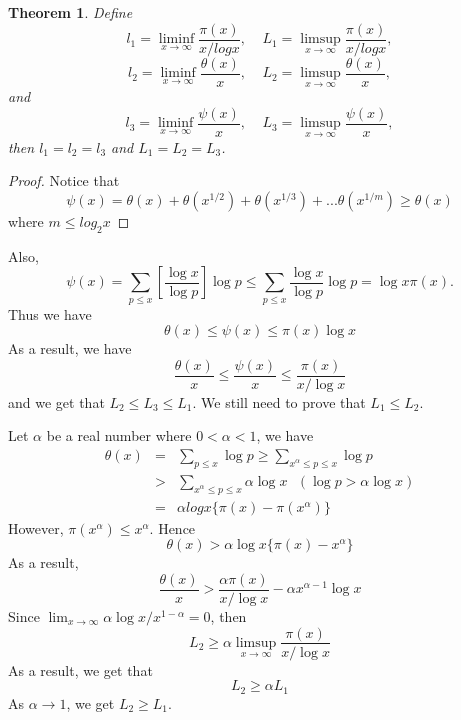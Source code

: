 \documentclass[12pt,letterpaper]{book}
\newtheorem{theorem}{Theorem}
\begin{document}
\begin{theorem}
Define
\begin{equation*}
l_1=\liminf_{x\rightarrow \infty}\frac{\pi(x)}{x/log x}, \ \ \ \ \
L_1=\limsup_{x\rightarrow \infty}\frac{\pi(x)}{x/log x},
\end{equation*}
\begin{equation*}
l_2=\liminf_{x\rightarrow \infty}\frac{\theta(x)}{x}, \ \ \ \ \
L_2=\limsup_{x\rightarrow \infty}\frac{\theta(x)}{x},
\end{equation*}
and
\begin{equation*}
l_3=\liminf_{x\rightarrow \infty}\frac{\psi(x)}{x}, \ \ \ \ \
L_3=\limsup_{x\rightarrow \infty}\frac{\psi(x)}{x},
\end{equation*}
then $l_1=l_2=l_3$ and $L_1=L_2=L_3$.
\end{theorem}
\begin{proof}
Notice that
\begin{equation*}
\psi(x)=\theta(x)+\theta(x^{1/2})+
\theta(x^{1/3})+...\theta(x^{1/m})\geq \theta(x)
\end{equation*}
where $m\leq log_2x$
\end{proof}
Also,
\begin{equation*}
\psi(x)=\sum_{p\leq x}\left[\frac{\log x}{\log p}\right]\log p\leq
\sum_{p\leq x}\frac{\log x}{\log p} \log p= \log x\pi(x).
\end{equation*}
Thus we have
\begin{equation*}
\theta(x)\leq \psi(x)\leq \pi(x)\log x
\end{equation*}
As a result, we have
\begin{equation*}
\frac{\theta(x)}{x}\leq \frac{\psi(x)}{x}\leq \frac{\pi(x)}{x/\log
x}
\end{equation*}
and we get that $L_2\leq L_3\leq L_1$. We still need to prove that
$L_1 \leq  L_2$.
\par Let $\alpha$ be a real number where $0<\alpha<1$, we have
\begin{eqnarray*}
\theta(x)&=&\sum_{p\leq x}\log p\geq \sum_{x^{\alpha}\leq p\leq
x}\log p\\ &>& \sum_{x^{\alpha}\leq p\leq x}\alpha \log x  \ \ \
(\log p>\alpha \log x)\\ &=&\alpha log x\{\pi(x)-\pi(x^{\alpha})\}
\end{eqnarray*}
However, $\pi(x^{\alpha})\leq x^{\alpha}$. Hence
\begin{equation*}
\theta(x)>\alpha \log x\{\pi(x)-x^{\alpha}\}
\end{equation*}
As a result,
\begin{equation*}
\frac{\theta(x)}{x} > \frac{\alpha \pi(x)}{x/ \log x}- \alpha
x^{\alpha-1}\log x
\end{equation*}
Since $\lim_{x\rightarrow \infty}\alpha \log x/x^{1-\alpha}=0$, then
\begin{equation*}
L_2\geq \alpha \limsup_{x\rightarrow \infty}\frac{\pi(x)}{x/\log x}
\end{equation*}
As a result, we get that
\begin{equation*}
L_2\geq \alpha L_1
\end{equation*}
As $\alpha \rightarrow 1$, we get $L_2\geq L_1$.
\end{document}
